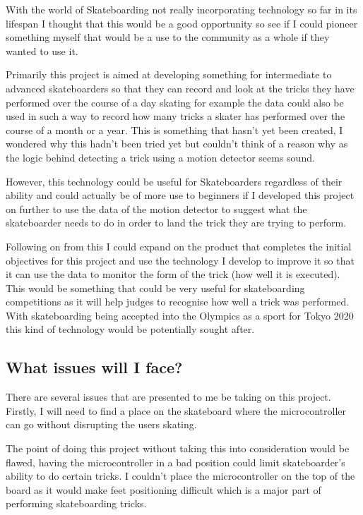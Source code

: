 With the world of Skateboarding not really incorporating technology so far in its lifespan I thought that this would be a good opportunity so see if I could pioneer something myself that would be a use to the community as a whole if they wanted to use it. 

Primarily this project is aimed at developing something for intermediate to advanced skateboarders so that they can record and look at the tricks they have performed over the course of a day skating for example the data could also be used in such a way to record how many tricks a skater has performed over the course of a month or a year. This is something that hasn’t yet been created, I wondered why this hadn’t been tried yet but couldn’t think of a reason why as the logic behind detecting a trick using a motion detector seems sound. 

However, this technology could be useful for Skateboarders regardless of their ability and could actually be of more use to beginners if I developed this project on further to use the data of the motion detector to suggest what the skateboarder needs to do in order to land the trick they are trying to perform.

Following on from this I could expand on the product that completes the initial objectives for this project and use the technology I develop to improve it so that it can use the data to monitor the form of the trick (how well it is executed). This would be something that could be very useful for skateboarding competitions as it will help judges to recognise how well a trick was performed. With skateboarding being accepted into the Olympics as a sport for Tokyo 2020 this kind of technology would be potentially sought after.
\subsection{What issues will I face?}\label{tor:projectissues}
There are several issues that are presented to me be taking on this project. Firstly, I will need to find a place on the skateboard where the microcontroller can go without disrupting the users skating.

The point of doing this project without taking this into consideration would be flawed, having the microcontroller in a bad position could limit skateboarder’s ability to do certain tricks. I couldn’t place the microcontroller on the top of the board as it would make feet positioning difficult which is a major part of performing skateboarding tricks. 

